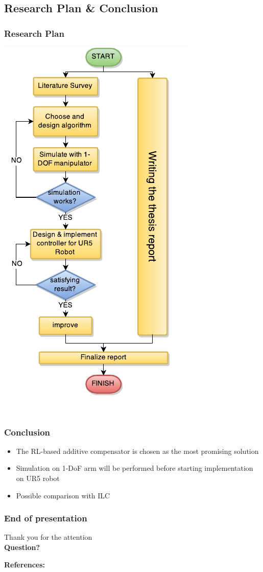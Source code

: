 \documentclass{beamer}
\begin{document}
			\subsection{Research Plan \& Conclusion}			
			\begin{frame}\frametitle{Research Plan}
				\begin{center}
					\includegraphics[width=0.345\linewidth]{images/research_plan}
				\end{center}
			\end{frame}

			\begin{frame}\frametitle{Conclusion}			
			\begin{itemize}
				\item The RL-based additive compensator is chosen as the most promising solution
				\item Simulation on 1-DoF arm will be performed before starting implementation on UR5 robot
				\item Possible comparison with ILC
			\end{itemize}
			\end{frame}		
			\begin{frame}\frametitle{End of presentation}			
					\begin{center}
						\centering
					Thank you for the attention \\
					\vspace{3mm}
					\fontsize{15}{4}\selectfont\textbf{ Question?}				
					\end{center}
					\fontsize{8}{4}\selectfont	
					\textbf{References: }
					\fontsize{7}{4}\selectfont
%						
%						
						
												
					
			\end{frame}				
				
		
\end{document}
